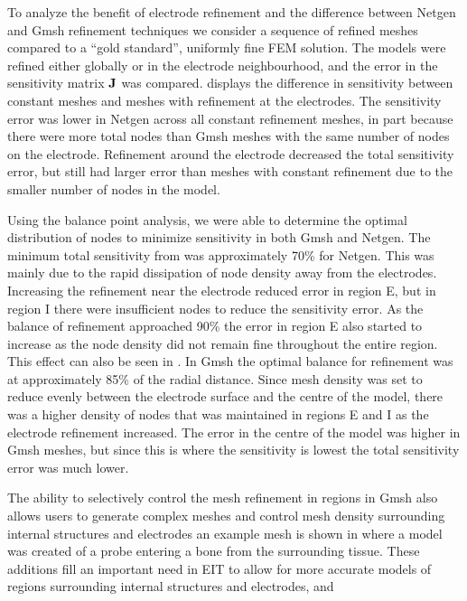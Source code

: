 To analyze the benefit of electrode refinement and the difference between 
Netgen and Gmsh refinement techniques we consider
a sequence of refined meshes compared to a ``gold standard'', uniformly fine
FEM solution. The models were refined either globally or in the electrode
neighbourhood, and the error in the sensitivity matrix $\bf J$ %
was compared.  displays the difference 
in sensitivity between constant meshes and meshes with refinement at the electrodes. 
The sensitivity error was lower in Netgen across all constant refinement meshes, in
part because there were more total nodes than Gmsh meshes with the same number
of nodes on the electrode. Refinement around the electrode decreased the total 
sensitivity error, but still had larger error than meshes with constant refinement 
due to the smaller number of nodes in the model. 

Using the balance point analysis, we were able to determine the optimal distribution
of nodes to minimize sensitivity in both Gmsh and Netgen. The minimum total sensitivity 
from  was approximately 70\% for Netgen. This was mainly 
due to the rapid dissipation of node density away from the electrodes. Increasing 
the refinement near the electrode reduced
error in region E, but in region I there were insufficient
nodes to reduce the sensitivity error. As the balance of refinement approached
90\% the error in region E also started to increase as the node density did not remain
fine throughout the entire region. This effect can also be seen in .
In Gmsh the optimal balance for refinement was at approximately 85\%
of the radial distance. Since mesh density was set to reduce evenly 
between the electrode surface and the centre of the model, there 
was a higher density of nodes that was maintained in regions E and I as the 
electrode refinement increased. The error in the centre of the model 
was higher in Gmsh meshes, but since this is where the sensitivity is 
lowest the total sensitivity error was much lower. 

The ability to selectively control the mesh refinement in regions in Gmsh also allows 
users to generate complex meshes and control mesh density surrounding internal structures 
and electrodes an example mesh is shown in  where a model was
created of
a probe entering a bone from the surrounding tissue. 
These additions fill an important need in EIT to allow for more accurate models 
of regions surrounding internal structures and electrodes, and 


